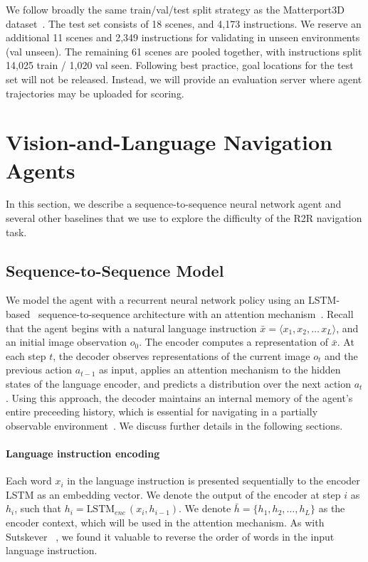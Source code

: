 \documentclass[10pt,twocolumn,letterpaper]{article}
\begin{document}
We follow broadly the same train/val/test split strategy as the Matterport3D dataset~\cite{Matterport3D}. The test set consists of 18 scenes, and 4,173 instructions. We reserve an additional 11 scenes and 2,349 instructions for validating in unseen environments (val unseen). The remaining 61 scenes are pooled together, with instructions split 14,025 train / 1,020 val seen. Following best practice, goal locations for the test set will not be released. Instead, we will provide an evaluation server where agent trajectories may be uploaded for scoring. 


 \section{Vision-and-Language Navigation Agents}

In this section, we describe a sequence-to-sequence neural network agent and several other baselines that we use to explore the difficulty of the R2R navigation task. 
\subsection{Sequence-to-Sequence Model}

We model the agent with a recurrent neural network policy using an LSTM-based~\cite{Hochreiter1997} sequence-to-sequence architecture with an attention mechanism~\cite{Bahdanau2015}. Recall that the agent begins with a natural language instruction $\bar{x}= \langle x_1,x_2,\dots\,x_L \rangle$, and an initial image observation $o_0$. The encoder computes a representation of $\bar{x}$. At each step $t$, the decoder observes representations of the current image $o_t$ and the previous action $a_{t-1}$ as input, applies an attention mechanism to the hidden states of the language encoder, and predicts a distribution over the next action $a_t$. Using this approach, the decoder maintains an internal memory of the agent's entire preceeding history, which is essential for navigating in a partially observable environment~\cite{wierstra2007solving}. We discuss further details in the following sections. 

\vspace{-0.3cm}
\paragraph{Language instruction encoding} 

Each word $x_i$ in the language instruction is presented sequentially to the encoder LSTM as an embedding vector. We denote the output of the encoder at step $i$ as $h_i$, such that $h_i=\textrm{LSTM}_{enc}\,(x_i,h_{i-1})$. We denote $\bar{h}=\{h_1,h_2,\dots,h_L\}$ as the encoder context, which will be used in the attention mechanism. As with Sutskever \etal~\cite{Sutskever2014}, we found it valuable to reverse the order of words in the input language instruction. 
\end{document}

